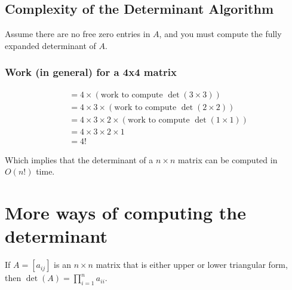 \documentclass[12pt]{article}
\begin{document}
\subsection{Complexity of the Determinant Algorithm}

Assume there are no free zero entries in $A$, and you must compute the 
fully expanded determinant of $A$.

\subsubsection{Work (in general) for a 4x4 matrix}

\begin{align*}
&= 4 \times (\text{work to compute } \det(3 \times 3)) \\
&= 4 \times 3 \times (\text{work to compute } \det(2 \times 2)) \\
&= 4 \times 3 \times 2 \times (\text{work to compute } \det(1 \times 1)) \\
&= 4 \times 3 \times 2 \times 1 \\
&= \boxed{4!}
\end{align*}

Which implies that the determinant of a $n \times n$ matrix can be computed
in $O(n!)$ time.

\section{More ways of computing the determinant}

If $A=[a_{ij}]$ is an $n\times n$ matrix that is either upper or lower
triangular form, then $\det(A) = \prod_{i=1}^n a_{ii}$.
\end{document}
